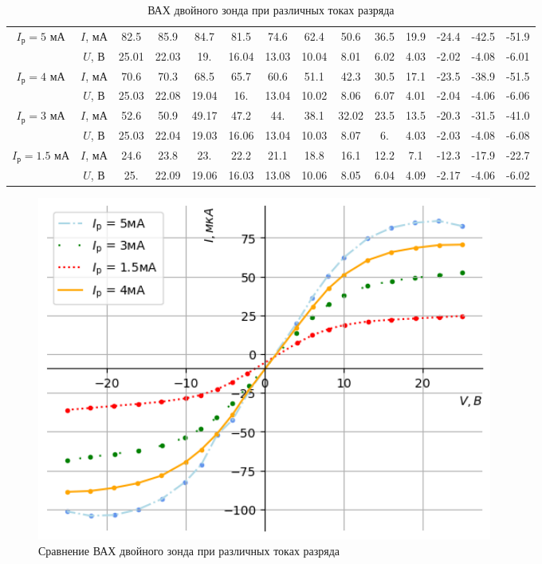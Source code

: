 \newpage
\begin{table}[h!]
    \centering
    \begin{tabular}{|c|c|c|c|c|c|c|c|c|c|c|c|c|c|}
        \hline
        \multirow{2}{*}{$I_{\text{р}} = 5$ мА} & $I$, мА & 82.5&85.9&84.7&81.5&74.6&62.4&50.6&36.5&19.9&-24.4&-42.5&-51.9\\
        &$U$, В & 25.01&  22.03&  19.  &  16.04&  13.03&  10.04&   8.01&   6.02& 4.03&  -2.02&  -4.08&  -6.01\\\hline
        \multirow{2}{*}{$I_{\text{р}} = 4$ мА} & $I$, мА & 70.6&  70.3&  68.5&  65.7&  60.6&  51.1&  42.3&  30.5&  17.1&
       -23.5& -38.9& -51.5\\
       &$U$, В & 25.03& 22.08& 19.04& 16.  & 13.04& 10.02&  8.06&  6.07&  4.01&
       -2.04& -4.06& -6.06\\\hline
       \multirow{2}{*}{$I_{\text{р}} = 3$ мА} & $I$, мА & 52.6 &  50.9 &  49.17&  47.2 &  44.  &  38.1 &  32.02&  23.5 &
        13.5 & -20.3 & -31.5 & -41.0\\
       &$U$, В & 25.03& 22.04& 19.03& 16.06& 13.04& 10.03&  8.07&  6.  &  4.03&
       -2.03& -4.08& -6.08\\\hline
       \multirow{2}{*}{$I_{\text{р}} = 1.5$ мА} & $I$, мА & 24.6&  23.8&  23. &  22.2&  21.1&  18.8&  16.1&  12.2&   7.1&
       -12.3& -17.9& -22.7\\
       &$U$, В & 25.  & 22.09& 19.06& 16.03& 13.08& 10.06&  8.05&  6.04&  4.09&
       -2.17& -4.06& -6.02\\\hline
    \end{tabular}
    \caption{ВАХ двойного зонда при различных токах разряда}
\end{table}
\begin{figure}[h!]
    \centering
    \includegraphics[width=15cm]{images/plot2.png}
    \caption{Сравнение ВАХ двойного зонда при различных токах разряда}
\end{figure}

